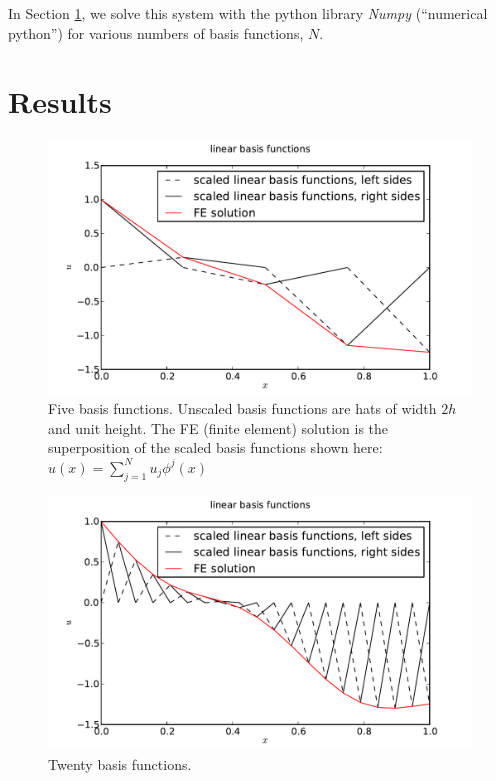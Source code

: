 \documentclass[10pt]{article}
\begin{document}
In Section \ref{sec:results}, we solve this system with the python library \textit{Numpy} (``numerical python'') for various numbers of basis functions, $N$.

\section{Results}
\label{sec:results}

\begin{figure}[ht]
    \centering
    \includegraphics[width=\columnwidth,keepaspectratio=true]{./hw7-basis_functions-N5.pdf}
    \caption{Five basis functions. Unscaled basis functions are hats of width $2h$ and unit height. The FE (finite element) solution is the superposition of the scaled basis functions shown here: $u(x)= \sum_{j=1}^{N}{u_j \phi^j(x)}$}
    \label{fig:N5}
\end{figure}

\begin{figure}[ht]
    \centering
    \includegraphics[width=\columnwidth,keepaspectratio=true]{./hw7-basis_functions-N20.pdf}
    \caption{Twenty basis functions.}
    \label{fig:N20}
\end{figure}
\end{document}
